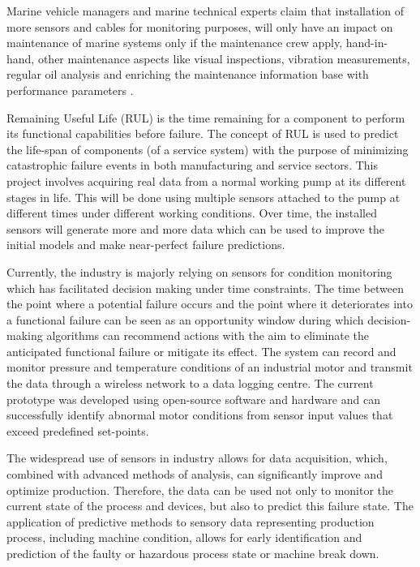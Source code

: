Marine vehicle managers and marine technical experts claim that installation of more sensors and cables for monitoring purposes, will only have an impact on maintenance of marine systems only if the maintenance crew apply, hand-in-hand, other maintenance aspects like visual inspections, vibration measurements, regular oil analysis and enriching the maintenance information base with performance parameters \cite{kimera_predictive_2020}. 

Remaining Useful Life (RUL) is the time remaining for a component to perform its functional capabilities before failure. The concept of RUL is used to predict the life-span of components (of a service system) with the purpose of minimizing catastrophic failure events in both manufacturing and service sectors. This project involves acquiring real data from a normal working pump at its different stages in life. This will be done using multiple sensors attached to the pump at different times under different working conditions. Over time, the installed sensors will generate more and more data which can be used to improve the initial models and make near-perfect failure predictions. 

Currently, the industry is majorly relying on sensors for condition monitoring which has facilitated decision making under time constraints. The time between the point where a potential failure occurs and the point where it deteriorates into a functional failure can be seen as an opportunity window during which decision-making algorithms can recommend actions with the aim to eliminate the anticipated functional failure or mitigate its effect. The system can record and monitor pressure and temperature conditions of an industrial motor and transmit the data through a wireless network to a data logging centre. The current prototype was developed using open-source software and hardware and can successfully identify abnormal motor conditions from sensor input values that exceed predefined set-points. 

The widespread use of sensors in industry allows for data acquisition, which, combined with advanced methods of analysis, can significantly improve and optimize production. Therefore, the data can be used not only to monitor the current state of the process and devices, but also to predict this failure state. The application of predictive methods to sensory data representing production process, including machine condition, allows for early identification and prediction of the faulty or hazardous process state or machine break down.

